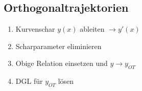 \subsection{Orthogonaltrajektorien}
    \vspace{0.5em}
    \begin{enumerate}
        \item Kurvenschar $y(x)$ ableiten $\to y'(x)$
        \item Scharparameter eliminieren
        \item Obige Relation einsetzen und $y \to y_{OT}$
        \item DGL für $y_{OT}$ lösen
    \end{enumerate}